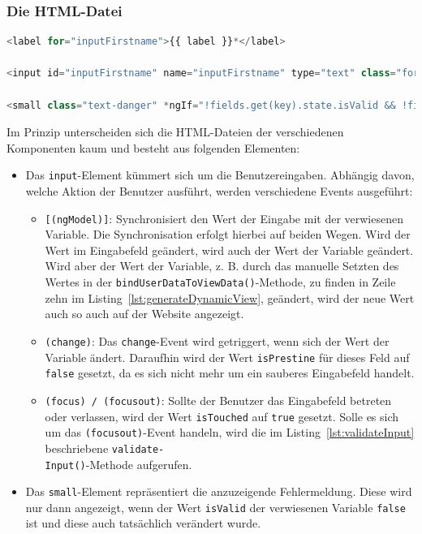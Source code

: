 \subsubsection{Die HTML-Datei}

\begin{lstlisting}[caption={Der HTML-Datei des \texttt{FirstnameComponent}}, language=JavaScript]
<label for="inputFirstname">{{ label }}*</label>

<input id="inputFirstname" name="inputFirstname" type="text" class="form-control" autocomplete="fname" [(ngModel)]="fields.get(key).value" (change)="validatorService.inputChanged(key)" (focus)="onFocusChange($event)" (focusout)="onFocusChange($event)"/>

<small class="text-danger" *ngIf="!fields.get(key).state.isValid && !fields.get(key).state.isPrestine">{{ errorMessage | translate}}</small>
\end{lstlisting}

Im Prinzip unterscheiden sich die HTML-Dateien der verschiedenen Komponenten kaum und besteht aus folgenden Elementen:

\begin{itemize}
	\item Das \texttt{input}-Element kümmert sich um die Benutzereingaben. Abhängig davon, welche Aktion der Benutzer ausführt, werden verschiedene Events ausgeführt:
	
		\begin{itemize}
			\item \texttt{[(ngModel)]}: Synchronisiert den Wert der Eingabe mit der verwiesenen Variable. Die Synchronisation erfolgt hierbei auf beiden Wegen. Wird der Wert im Eingabefeld geändert, wird auch der Wert der Variable geändert. Wird aber der Wert der Variable, z. B. durch das manuelle Setzten des Wertes in der \texttt{bindUserDataToViewData()}-Methode, zu finden in Zeile zehn im Listing~\ref{lst:generateDynamicView}, geändert, wird der neue Wert auch so auch auf der Website angezeigt. 
			
			\item \texttt{(change)}: Das \texttt{change}-Event wird getriggert, wenn sich der Wert der Variable ändert. Daraufhin wird der Wert \texttt{isPrestine} für dieses Feld auf \texttt{false} gesetzt, da es sich nicht mehr um ein sauberes Eingabefeld handelt.
			
			\item \texttt{(focus) / (focusout)}:  Sollte der Benutzer das Eingabefeld betreten oder verlassen, wird der  Wert \texttt{isTouched} auf \texttt{true} gesetzt. Solle es sich um das \texttt{(focusout)}-Event handeln, wird die im Listing~\ref{lst:validateInput} beschriebene \texttt{validate-\\Input()}-Methode aufgerufen.
		\end{itemize} 
	
	\item Das \texttt{small}-Element repräsentiert die anzuzeigende Fehlermeldung. Diese wird nur dann angezeigt, wenn der Wert \texttt{isValid} der verwiesenen Variable \texttt{false} ist und diese auch tatsächlich verändert wurde. 
\end{itemize}

